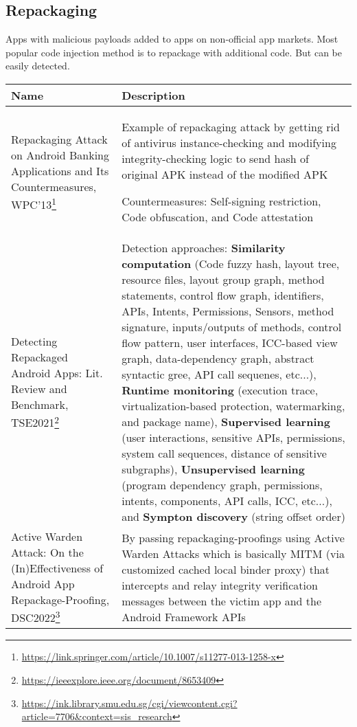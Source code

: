 \label{task:202405122_android}


\subsection{Repackaging}

Apps with malicious payloads added to apps on non-official app markets. Most popular code injection method is to repackage with additional code. But can be easily detected.

\begin{longtable}{p{.3\linewidth}p{.65\linewidth}} 
\toprule
Name & Description \\
\midrule
\endhead

Repackaging Attack on Android Banking Applications and Its Countermeasures, WPC'13\footnote{\url{https://link.springer.com/article/10.1007/s11277-013-1258-x}}
& Example of repackaging attack by getting rid of antivirus instance-checking and modifying integrity-checking logic to send hash of original APK instead of the modified APK

Countermeasures: Self-signing restriction, Code obfuscation, and Code attestation
\\

Detecting Repackaged Android Apps: Lit. Review and Benchmark, TSE2021\footnote{\url{https://ieeexplore.ieee.org/document/8653409}}
& Detection approaches: \textbf{Similarity computation} (Code fuzzy hash, layout tree, resource files, layout group graph, method statements, control flow graph, identifiers, APIs, Intents, Permissions, Sensors, method signature, inputs/outputs of methods, control flow pattern, user interfaces, ICC-based view graph, data-dependency graph, abstract syntactic gree, API call sequenes, etc...), \textbf{Runtime monitoring} (execution trace, virtualization-based protection, watermarking, and package name), \textbf{Supervised learning} (user interactions, sensitive APIs, permissions, system call sequences, distance of sensitive subgraphs), \textbf{Unsupervised learning} (program dependency graph, permissions, intents, components, API calls, ICC, etc...), and \textbf{Sympton discovery} (string offset order)
\\

Active Warden Attack: On the (In)Effectiveness
of Android App Repackage-Proofing, DSC2022\footnote{\url{https://ink.library.smu.edu.sg/cgi/viewcontent.cgi?article=7706&context=sis_research}}
& By passing repackaging-proofings using Active Warden Attacks which is basically MITM (via customized cached local binder proxy) that intercepts and relay integrity verification messages between the victim app and the Android Framework APIs


\end{longtable}
